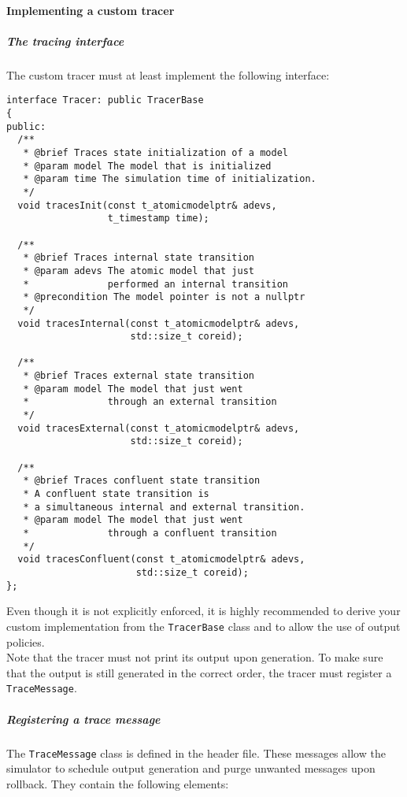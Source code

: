 \paragraph{Implementing a custom tracer}
\subparagraph{The tracing interface}
The custom tracer must at least implement the following interface:
\begin{lstlisting}
interface Tracer: public TracerBase
{
public:
  /**
   * @brief Traces state initialization of a model
   * @param model The model that is initialized
   * @param time The simulation time of initialization.
   */
  void tracesInit(const t_atomicmodelptr& adevs,
                  t_timestamp time);

  /**
   * @brief Traces internal state transition
   * @param adevs The atomic model that just
   *              performed an internal transition
   * @precondition The model pointer is not a nullptr
   */
  void tracesInternal(const t_atomicmodelptr& adevs,
                      std::size_t coreid);

  /**
   * @brief Traces external state transition
   * @param model The model that just went
   *              through an external transition
   */
  void tracesExternal(const t_atomicmodelptr& adevs,
                      std::size_t coreid);

  /**
   * @brief Traces confluent state transition
   * A confluent state transition is
   * a simultaneous internal and external transition.
   * @param model The model that just went
   *              through a confluent transition
   */
  void tracesConfluent(const t_atomicmodelptr& adevs,
                       std::size_t coreid);
};
\end{lstlisting}
Even though it is not explicitly enforced, it is highly recommended to derive your custom implementation from the \lstinline{TracerBase} class and to allow the use of output policies.\\
Note that the tracer must not print its output upon generation. To make sure that the output is still generated in the correct order, the tracer must register a \lstinline{TraceMessage}.
\subparagraph{Registering a trace message}
The \lstinline{TraceMessage} class is defined in the  header file. These messages allow the simulator to schedule output generation and purge unwanted messages upon rollback. They contain the following elements:
